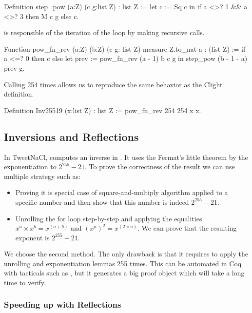 \begin{Coq}
Definition step_pow (a:Z) (c g:list Z) : list Z :=
  let c := Sq c in
    if a <>? 1 && a <>? 3
    then M c g
    else c.
\end{Coq}

 is responsible of the iteration of the loop by making
recursive calls.
\begin{Coq}
Function pow_fn_rev (a:Z) (b:Z) (c g: list Z)
  {measure Z.to_nat a} : (list Z) :=
  if a <=? 0
    then c
    else
      let prev := pow_fn_rev (a - 1) b c g in
        step_pow (b - 1 - a) prev g.
\end{Coq}


Calling  254 times allows us to reproduce the same behavior as
the Clight definition.
\begin{Coq}
Definition Inv25519 (x:list Z) : list Z :=
  pow_fn_rev 254 254 x x.
\end{Coq}

\subsection{Inversions and Reflections}

In TweetNaCl,  computes an inverse in \Zfield. It uses the
Fermat's little theorem by the exponentiation to $2^{255}-21$. To prove the
correctness of the result we can use multiple strategy such as:
\begin{itemize}
  \item Proving it is special case of square-and-multiply algorithm applied to
  a specific number and then show that this number is indeed $2^{255}-21$.
  \item Unrolling the for loop step-by-step and applying the equalities
  $x^a \times x^b = x^{(a+b)}$ and $(x^a)^2 = x^{(2 \times a)}$. We can prove that
  the resulting exponent is $2^{255}-21$.
\end{itemize}

We choose the second method. The only drawback is that it requires to apply the
unrolling and exponentiation lemmas 255 times. This can be automated in Coq with
tacticals such as , but it generates a big proof object which
will take a long time to verify.

\subsubsection{Speeding up with Reflections}


